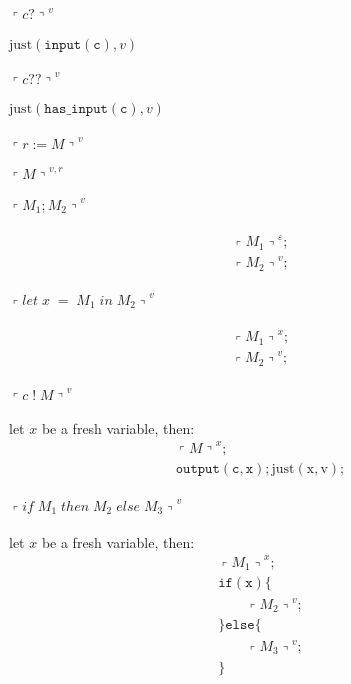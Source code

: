 \documentclass{article}
\newcommand{\q}[1]{\ensuremath{\left\ulcorner #1\right\urcorner}}
\begin{document}
\paragraph{$\q{c?}^v$  } $\mathrm{just}(\mathtt{input(c)}, v)$

\paragraph{$\q{c??}^v$  } $\mathrm{just}(\mathtt{has\_input(c)}, v)$

\paragraph{$\q{r := M}^v$  } $\q{M}^{v,r}$

\paragraph{$\q{M_1; M_2}^v$  }
\[\begin{array}{l}
\q{M_1}^\varepsilon; \\
\q{M_2}^v;
\end{array}\]

\paragraph{$\q{let \; x \; = \; M_1 \; in \; M_2}^v$  }
\[\begin{array}{l}
\q{M_1}^x; \\
\q{M_2}^v;
\end{array}\]

\paragraph{$\q{c \; ! \; M}^v$  }
let $x$ be a fresh variable, then:
\[\begin{array}{l}
    \q{M}^{x}; \\
    \mathtt{output(c, x)};
    \mathrm{just(x, v)};
\end{array}\]

\paragraph{$\q{if \; M_1 \; then \; M_2 \; else \; M_3}^v$  }
let $x$ be a fresh variable, then:
\[\begin{array}{l}
\q{M_1}^x; \\
\mathtt{if (x) \{} \\
\qquad \q{M_2}^v; \\
\mathtt{\} else \{} \\
\qquad \q{M_3}^v; \\
\mathtt{\}}
\end{array}\]
\end{document}
